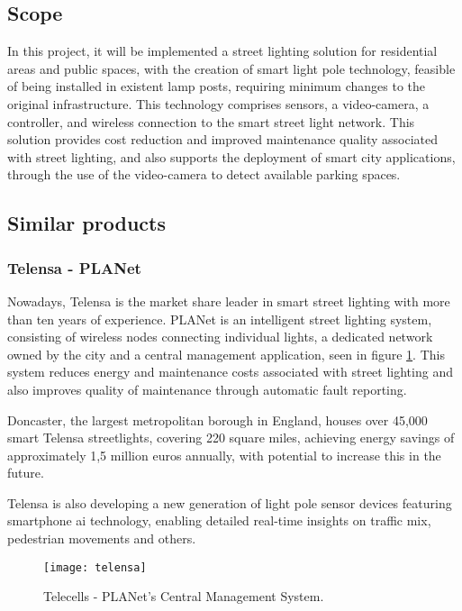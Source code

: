 \subsection{Scope}

In this project, it will be implemented a street lighting solution for residential areas and public spaces, with the creation of smart light pole technology, feasible of being installed in existent lamp posts, requiring minimum changes to the original infrastructure. This technology comprises sensors, a video-camera, a controller, and wireless connection to the smart street light network. This solution provides cost reduction and improved maintenance quality associated with street lighting, and also supports the deployment of smart city applications, through the use of the video-camera to detect available parking spaces.

\subsection{Similar products}

\subsubsection{Telensa - PLANet}

Nowadays, Telensa is the market share leader in smart street lighting with more than ten years of experience.\cite{telensa} PLANet is an intelligent street lighting system, consisting of wireless nodes connecting individual lights, a dedicated network owned by the city and a central management application, seen in figure \ref{fig:telensa}. This system reduces energy and maintenance costs associated with street lighting and also improves quality of maintenance through automatic fault reporting.

Doncaster, the largest metropolitan borough in England, houses over 45,000 smart Telensa streetlights, covering 220 square miles, achieving energy savings of approximately 1,5 million euros annually, with potential to increase this in the future.

Telensa is also developing a new generation of light pole sensor devices featuring smartphone \ac{ai} technology, enabling detailed real-time insights on traffic mix, pedestrian movements and others.

\begin{figure}[ht]
	\centering
	\texttt{[image: telensa]}
	\caption{Telecells - PLANet's Central Management System.}
	\label{fig:telensa}
\end{figure}


